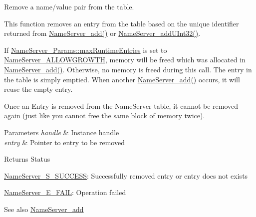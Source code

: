 Remove a name/value pair from the table. 

This function removes an entry from the table based on the unique identifier returned from \hyperlink{_name_server_8h_ad7d45ed8fe5bcd1f10da5914c8da39f5}{Name\-Server\-\_\-add()} or \hyperlink{_name_server_8h_ac130195a04a34dfa2daba6ec3fff65d6}{Name\-Server\-\_\-add\-U\-Int32()}.

If \hyperlink{struct_name_server___params_a26ee68e20b559b4c238c1e5a8646191f}{Name\-Server\-\_\-\-Params\-::max\-Runtime\-Entries} is set to \hyperlink{_name_server_8h_aee02296103cd2e162143d40c917697d7}{Name\-Server\-\_\-\-A\-L\-L\-O\-W\-G\-R\-O\-W\-T\-H}, memory will be freed which was allocated in \hyperlink{_name_server_8h_ad7d45ed8fe5bcd1f10da5914c8da39f5}{Name\-Server\-\_\-add()}. Otherwise, no memory is freed during this call. The entry in the table is simply emptied. When another \hyperlink{_name_server_8h_ad7d45ed8fe5bcd1f10da5914c8da39f5}{Name\-Server\-\_\-add()} occurs, it will reuse the empty entry.

Once an Entry is removed from the Name\-Server table, it cannot be removed again (just like you cannot free the same block of memory twice).


\begin{DoxyParams}{Parameters}
{\em handle} & Instance handle \\
\hline
{\em entry} & Pointer to entry to be removed\\
\hline
\end{DoxyParams}
\begin{DoxyReturn}{Returns}
Status
\begin{DoxyItemize}
\item \hyperlink{_name_server_8h_a49cbe5edf8e519b17e323d01431e8161}{Name\-Server\-\_\-\-S\-\_\-\-S\-U\-C\-C\-E\-S\-S}\-: Successfully removed entry or entry does not exists
\item \hyperlink{_name_server_8h_a2ffd6887c6aca49d73982fb226db679c}{Name\-Server\-\_\-\-E\-\_\-\-F\-A\-I\-L}\-: Operation failed
\end{DoxyItemize}
\end{DoxyReturn}
\begin{DoxySeeAlso}{See also}
\hyperlink{_name_server_8h_ad7d45ed8fe5bcd1f10da5914c8da39f5}{Name\-Server\-\_\-add} 
\end{DoxySeeAlso}
